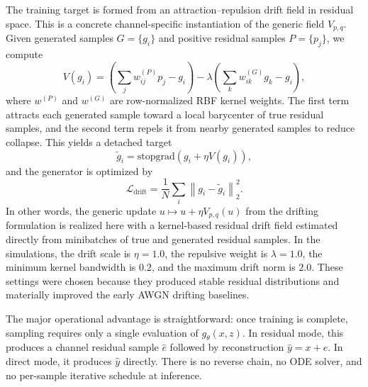 \documentclass[conference]{IEEEtran}
\begin{document}
The training target is formed from an attraction--repulsion drift field in residual space.
This is a concrete channel-specific instantiation of the generic field \(V_{p,q}\).
Given generated samples \(G = \{g_i\}\) and positive residual samples \(P = \{p_j\}\), we compute
\begin{equation}
V(g_i)
=
\left(
\sum_j w^{(P)}_{ij} p_j - g_i
\right)
-
\lambda
\left(
\sum_k w^{(G)}_{ik} g_k - g_i
\right),
\end{equation}
where \(w^{(P)}\) and \(w^{(G)}\) are row-normalized RBF kernel weights.
The first term attracts each generated sample toward a local barycenter of true residual samples, and the second term repels it from nearby generated samples to reduce collapse.
This yields a detached target
\begin{equation}
\tilde{g}_i
=
\mathrm{stopgrad}\!\left(g_i + \eta V(g_i)\right),
\end{equation}
and the generator is optimized by
\begin{equation}
\mathcal{L}_{\text{drift}}
=
\frac{1}{N}
\sum_i
\left\|
g_i - \tilde{g}_i
\right\|_2^2.
\end{equation}
In other words, the generic update \(u \mapsto u + \eta V_{p,q}(u)\) from the drifting formulation is realized here with a kernel-based residual drift field estimated directly from minibatches of true and generated residual samples.
In the simulations, the drift scale is \(\eta=1.0\), the repulsive weight is \(\lambda=1.0\), the minimum kernel bandwidth is \(0.2\), and the maximum drift norm is \(2.0\).
These settings were chosen because they produced stable residual distributions and materially improved the early AWGN drifting baselines.

The major operational advantage is straightforward:
once training is complete, sampling requires only a single evaluation of \(g_\theta(x,z)\).
In residual mode, this produces a channel residual sample \(\hat e\) followed by reconstruction \(\hat y=x+\hat e\). In direct mode, it produces \(\hat y\) directly.
There is no reverse chain, no ODE solver, and no per-sample iterative schedule at inference.

%
\end{document}
